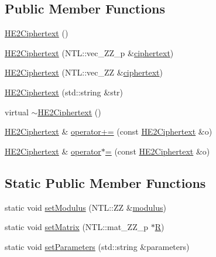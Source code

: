 \subsection*{Public Member Functions}
\begin{DoxyCompactItemize}
\item 
\hyperlink{classHE2Ciphertext_ad5bfed280b98c618f55fb7bf28a7b1cd}{H\+E2\+Ciphertext} ()
\item 
\hyperlink{classHE2Ciphertext_a8d74aeeaa1af989e7e033f5f35c54550}{H\+E2\+Ciphertext} (N\+T\+L\+::vec\+\_\+\+Z\+Z\+\_\+p \&\hyperlink{classCiphertext_adef9aae9d923eb100b4a1ad58ce495f1}{ciphertext})
\item 
\hyperlink{classHE2Ciphertext_a3c8e2e1657aab1597223ed3b04cdff0e}{H\+E2\+Ciphertext} (N\+T\+L\+::vec\+\_\+\+ZZ \&\hyperlink{classCiphertext_adef9aae9d923eb100b4a1ad58ce495f1}{ciphertext})
\item 
\hyperlink{classHE2Ciphertext_a0b43eb4010e5dcb24c185b16f96fdf18}{H\+E2\+Ciphertext} (std\+::string \&str)
\item 
virtual \hyperlink{classHE2Ciphertext_a5acc06ab4a495f477c43814bea877dcd}{$\sim$\+H\+E2\+Ciphertext} ()
\item 
\hyperlink{classHE2Ciphertext}{H\+E2\+Ciphertext} \& \hyperlink{classHE2Ciphertext_a5c54fb70a082d42607ed6923b9d9118b}{operator+=} (const \hyperlink{classHE2Ciphertext}{H\+E2\+Ciphertext} \&o)
\item 
\hyperlink{classHE2Ciphertext}{H\+E2\+Ciphertext} \& \hyperlink{classHE2Ciphertext_aa0502b251b22d25db90ef16bc2f05122}{operator$\ast$=} (const \hyperlink{classHE2Ciphertext}{H\+E2\+Ciphertext} \&o)
\end{DoxyCompactItemize}
\subsection*{Static Public Member Functions}
\begin{DoxyCompactItemize}
\item 
static void \hyperlink{classHE2Ciphertext_afb27eefed819559aaebdaf0eb10d7311}{set\+Modulus} (N\+T\+L\+::\+ZZ \&\hyperlink{classHE2Ciphertext_a590c7d8432a2a73ebe0607f402c6a46a}{modulus})
\item 
static void \hyperlink{classHE2Ciphertext_a8369345555e2b6df742e238353bd8707}{set\+Matrix} (N\+T\+L\+::mat\+\_\+\+Z\+Z\+\_\+p $\ast$\hyperlink{classHE2Ciphertext_aad6e0d90aa41cb80b75feebc1b07e1c0}{R})
\item 
static void \hyperlink{classHE2Ciphertext_ae3b1a39f8c20cc4d97bcc1ea70cf641e}{set\+Parameters} (std\+::string \&parameters)
\end{DoxyCompactItemize}
